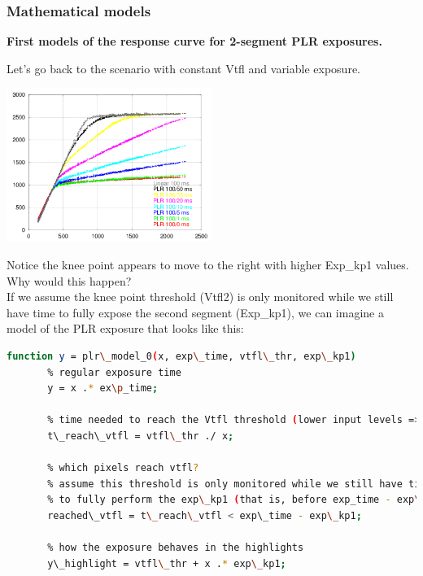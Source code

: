 {\subsubsection{Mathematical models}

\textbf{First models of the response curve for 2-segment PLR exposures.}

Let's go back to the scenario with constant Vtfl and variable exposure. 

\begin{center}
\includegraphics[height=5cm]{images/100-x-32-plr-vs-30ms-lin}
\end{center}

Notice the knee point appears to move to the right with higher Exp\_kp1 values. Why would this happen?\\

If we assume the knee point threshold (Vtfl2) is only monitored while we still have time to fully expose the second segment (Exp\_kp1), we can imagine a model of the PLR exposure that looks like this:\\

\begin{lstlisting}[language=bash,morekeywords=$,keywordstyle=\bfseries,frame=none,xleftmargin=.25in,belowskip=2em, aboveskip=2em]
    function y = plr\_model_0(x, exp\_time, vtfl\_thr, exp\_kp1)
       % regular exposure time
       y = x .* ex\p_time;
       
       % time needed to reach the Vtfl threshold (lower input levels => longer times)
       t\_reach\_vtfl = vtfl\_thr ./ x;
       
       % which pixels reach vtfl?
       % assume this threshold is only monitored while we still have time
       % to fully perform the exp\_kp1 (that is, before exp_time - exp\_kp1)
       reached\_vtfl = t\_reach\_vtfl < exp\_time - exp\_kp1;
       
       % how the exposure behaves in the highlights
       y\_highlight = vtfl\_thr + x .* exp\_kp1;
       

\end{lstlisting}}
